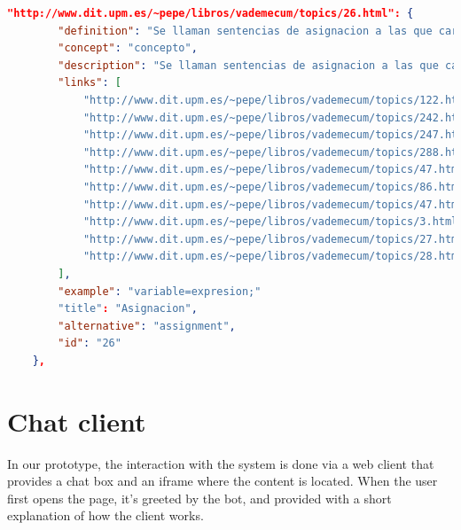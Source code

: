 \begin{center} 
  \begin{lstlisting}[language=JSON, captionpos=b, caption=Example extractor, label=listing:examplejsonvademecum]   
 "http://www.dit.upm.es/~pepe/libros/vademecum/topics/26.html": {
        "definition": "Se llaman sentencias de asignacion a las que cargan un nuevo valor en una variable", 
        "concept": "concepto", 
        "description": "Se llaman sentencias de asignacion a las que cargan un nuevo valor en una variable: El tipo de la variable debe ser igual al de la expresion en tipos primitivos:  asignable por promocion (ver \"Promocion\")  asignable por reduccion (ver \"Reduccion\")  en objetos:  asignable por Upcasting (ver \"Casting\") asignable por Downcasting (ver \"Casting\")", 
        "links": [
            "http://www.dit.upm.es/~pepe/libros/vademecum/topics/122.html", 
            "http://www.dit.upm.es/~pepe/libros/vademecum/topics/242.html", 
            "http://www.dit.upm.es/~pepe/libros/vademecum/topics/247.html", 
            "http://www.dit.upm.es/~pepe/libros/vademecum/topics/288.html", 
            "http://www.dit.upm.es/~pepe/libros/vademecum/topics/47.html", 
            "http://www.dit.upm.es/~pepe/libros/vademecum/topics/86.html", 
            "http://www.dit.upm.es/~pepe/libros/vademecum/topics/47.html", 
            "http://www.dit.upm.es/~pepe/libros/vademecum/topics/3.html", 
            "http://www.dit.upm.es/~pepe/libros/vademecum/topics/27.html", 
            "http://www.dit.upm.es/~pepe/libros/vademecum/topics/28.html"
        ], 
        "example": "variable=expresion;"
        "title": "Asignacion", 
        "alternative": "assignment", 
        "id": "26"
    }, 

  \end{lstlisting}
\end{center}


\section{Chat client}
\label{sec:chatclient}

In our prototype, the interaction with the system is done via a web client that provides a chat box and an iframe where the content is located. When the user first opens the page, it's greeted by the bot, and provided with a   short explanation of how the client works.

